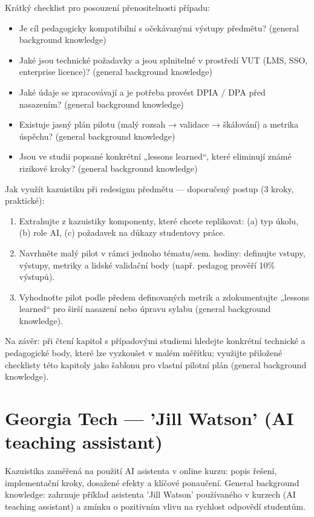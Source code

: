 \documentclass{report}%
\begin{document}
Krátký checklist pro posouzení přenositelnosti případu:
\begin{itemize}
  \item Je cíl pedagogicky kompatibilní s očekávanými výstupy předmětu? (general background knowledge)
  \item Jaké jsou technické požadavky a jsou splnitelné v prostředí VUT (LMS, SSO, enterprise licence)? (general background knowledge)
  \item Jaké údaje se zpracovávají a je potřeba provést DPIA / DPA před nasazením? (general background knowledge)
  \item Existuje jasný plán pilotu (malý rozsah → validace → škálování) a metrika úspěchu? (general background knowledge)
  \item Jsou ve studii popsané konkrétní „lessons learned“, které eliminují známé rizikové kroky? (general background knowledge)
\end{itemize}

Jak využít kazuistiku při redesignu předmětu — doporučený postup (3 kroky, praktické):
\begin{enumerate}
  \item Extrahujte z kazuistiky komponenty, které chcete replikovat: (a) typ úkolu, (b) role AI, (c) požadavek na důkazy studentovy práce.
  \item Navrhněte malý pilot v rámci jednoho tématu/sem. hodiny: definujte vstupy, výstupy, metriky a lidské validační body (např. pedagog prověří 10\% výstupů).
  \item Vyhodnoťte pilot podle předem definovaných metrik a zdokumentujte „lessons learned“ pro širší nasazení nebo úpravu sylabu (general background knowledge).
\end{enumerate}

Na závěr: při čtení kapitol s případovými studiemi hledejte konkrétní technické a pedagogické body, které lze vyzkoušet v malém měřítku; využijte přiložené checklisty této kapitoly jako šablonu pro vlastní pilotní plán (general background knowledge).%

%
\section{Georgia Tech — 'Jill Watson' (AI teaching assistant)}%
Kazuistika zaměřená na použití AI asistenta v online kurzu: popis řešení, implementační kroky, dosažené efekty a klíčové ponaučení. General background knowledge: zahrnuje příklad asistenta 'Jill Watson' používaného v kurzech (AI teaching assistant) a zmínku o pozitivním vlivu na rychlost odpovědí studentům.%
\end{document}
